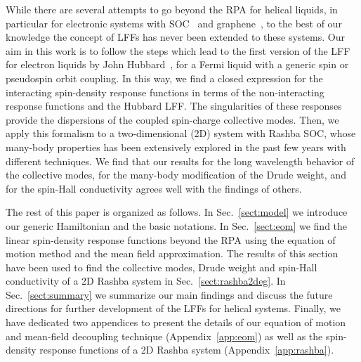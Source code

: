 \documentclass[aps, pra, reprint,superscriptaddress]{revtex4-1}
\begin{document}
While there are several attempts to go beyond the RPA for helical liquids, in particular for electronic systems with SOC~\cite{Amit2011,Maiti2015} and graphene~\cite{Abedinpour2011}, to the best of our knowledge the concept of LFFs has never been extended to these systems. Our aim in this work is to follow the steps which lead to the first version of the LFF for electron liquids by John Hubbard~\cite{Hubbard_1957}, for a Fermi liquid with a generic spin or pseudospin orbit coupling. In this way, we find a closed expression for the interacting spin-density response functions in terms of the non-interacting response functions and the Hubbard LFF. The singularities of these responses provide the dispersions of the coupled spin-charge collective modes. Then, we apply this formalism to a two-dimensional (2D) system with Rashba SOC, whose many-body properties has been extensively explored in the past few years with different techniques. We find that our results for the long wavelength behavior of the collective modes, for the many-body modification of the Drude weight, and for the spin-Hall conductivity agrees well with the findings of others. 

The rest of this paper is organized as follows. In Sec.~\ref{sect:model} we introduce our generic Hamiltonian and the basic notations. In Sec.~\ref{sect:eom} we find the linear spin-density response functions beyond the RPA using the equation of motion method and the mean field approximation. The results of this section have been used to find the collective modes, Drude weight and spin-Hall conductivity of a 2D Rashba system in Sec.~\ref{sect:rashba2deg}. In Sec.~\ref{sect:summary} we summarize our main findings and discuss the future directions for further development of the LFFs for helical systems. Finally, we have dedicated two appendices to present the details of our equation of motion and mean-field decoupling technique (Appendix~\ref{app:eom}) as well as the spin-density response functions of a 2D Rashba system (Appendix~\ref{app:rashba}).
 
\end{document}
